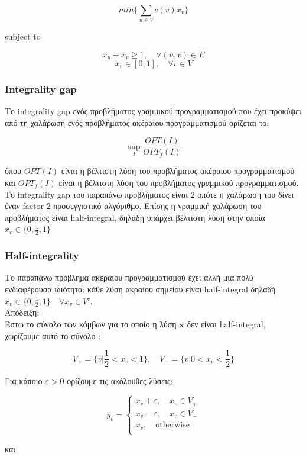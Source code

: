 $$min\{\displaystyle\sum_{u\in{V}} c(v)x_v\}$$ 
\centerline{subject to}
$$x_u + x_v \geq{1}, \quad \forall (u, v) \in{E}$$
$$ x_v \in [0,1], \quad \forall v \in{V}$$

\subsubsection{Integrality gap}
Το integrality gap ενός προβλήματος γραμμικού προγραμματισμού που έχει προκύψει από τη χαλάρωση ενός προβλήματος ακέραιου προγραμματισμού ορίζεται το:

$$\sup_{I} \frac{OPT(I)}{OPT_f(I)}$$

όπου $OPT(I)$ είναι η βέλτιστη λύση του προβλήματος ακέραιου προγραμματισμού και $OPT_f(I)$ είναι η βέλτιστη λύση του προβλήματος γραμμικού προγραμματισμού.\\

Το integrality gap του παραπάνω προβλήματος είναι $2$ οπότε η χαλάρωση του δίνει έναν factor-$2$ προσεγγιστικό αλγόριθμο. Επίσης η γραμμική χαλάρωση του προβλήματος είναι half-integral, δηλάδη υπάρχει βέλτιστη λύση στην οποία $x_v \in{\{0, \frac{1}{2}, 1\}}$	

\subsubsection{Half-integrality}

Το παραπάνω πρόβλημα ακέραιου προγραμματισμού έχει αλλή μια πολύ ενδιαφέρουσα ιδιότητα: κάθε λύση ακραίου σημείου είναι half-integral δηλαδή $x_v \in{\{0, \frac{1}{2}, 1\}} \quad \forall x_v \in V'$\cite{AppAlg}.\\

Απόδειξη:\\
Έστω το σύνολο των κόμβων για το οποίο η λύση $\boldsymbol{x}$ δεν είναι half-integral, χωρίζουμε αυτό το σύνολο :

$$V_{+}=\Big\{v \Big| \frac{1}{2} < x_v < 1\Big\}, \quad V_{-}=\Big\{v \Big| 0 < x_v < \frac{1}{2} \Big\}$$

Για κάποιο $\varepsilon > 0$ ορίζουμε τις ακόλουθες λύσεις: 

$$y_v = \begin{cases}
x_v + \varepsilon, \quad x_v \in V_{+}\\
x_v - \varepsilon, \quad x_v \in V_{-}\\
x_v , \quad \text{otherwise}\\
\end{cases}$$

και 

